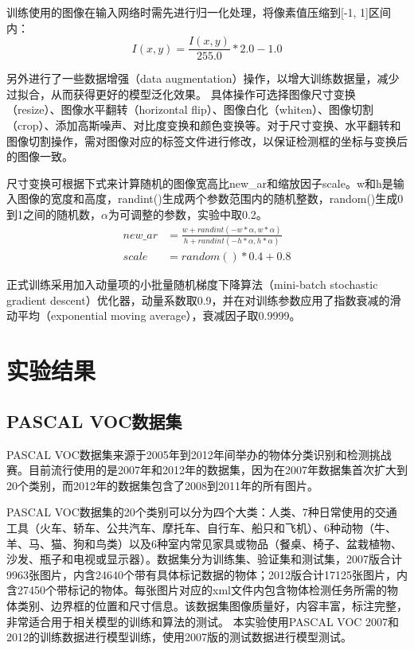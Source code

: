 

训练使用的图像在输入网络时需先进行归一化处理，将像素值压缩到[-1, 1]区间内：
\begin{equation}
I(x, y) = \frac{I(x, y)}{255.0} * 2.0 - 1.0
\end{equation}

另外进行了一些数据增强（data augmentation）操作，以增大训练数据量，减少过拟合，从而获得更好的模型泛化效果。
具体操作可选择图像尺寸变换（resize）、图像水平翻转（horizontal flip）、图像白化（whiten）、图像切割（crop）、添加高斯噪声、对比度变换和颜色变换等。对于尺寸变换、水平翻转和图像切割操作，需对图像对应的标签文件进行修改，以保证检测框的坐标与变换后的图像一致。

尺寸变换可根据下式来计算随机的图像宽高比new\_ar和缩放因子scale。w和h是输入图像的宽度和高度，randint()生成两个参数范围内的随机整数，random()生成0到1之间的随机数，$\alpha$为可调整的参数，实验中取0.2。
\begin{align} %
new\_ar &= \frac{w + randint(-w*\alpha, w*\alpha)}{h + randint(-h*\alpha, h*\alpha)} \\
scale &= random() * 0.4 + 0.8
\end{align}

正式训练采用加入动量项的小批量随机梯度下降算法（mini-batch stochastic gradient descent）优化器，动量系数取0.9，并在对训练参数应用了指数衰减的滑动平均（exponential moving average），衰减因子取0.9999。

\section{实验结果}

\subsection{PASCAL VOC数据集}
PASCAL VOC数据集来源于2005年到2012年间举办的物体分类识别和检测挑战赛。目前流行使用的是2007年和2012年的数据集，因为在2007年数据集首次扩大到20个类别，而2012年的数据集包含了2008到2011年的所有图片。

PASCAL VOC数据集的20个类别可以分为四个大类：人类、7种日常使用的交通工具（火车、轿车、公共汽车、摩托车、自行车、船只和飞机）、6种动物（牛、羊、马、猫、狗和鸟类）以及6种室内常见家具或物品（餐桌、椅子、盆栽植物、沙发、瓶子和电视或显示器）。数据集分为训练集、验证集和测试集，2007版合计9963张图片，内含24640个带有具体标记数据的物体；2012版合计17125张图片，内含27450个带标记的物体。每张图片对应的xml文件内包含物体检测任务所需的物体类别、边界框的位置和尺寸信息。该数据集图像质量好，内容丰富，标注完整，非常适合用于相关模型的训练和算法的测试。
本实验使用PASCAL VOC 2007和2012的训练数据进行模型训练，使用2007版的测试数据进行模型测试。

